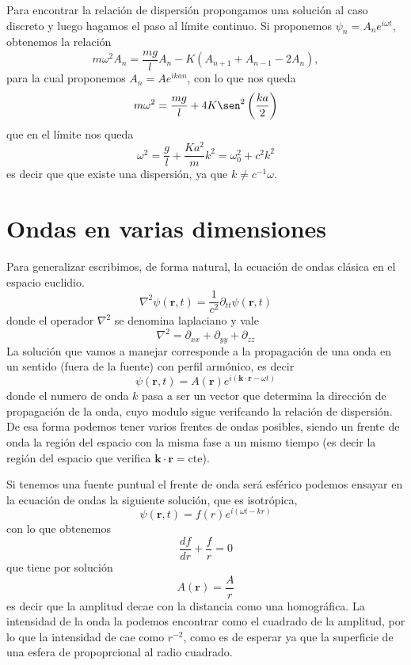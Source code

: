 \documentclass[a4paper]{article}
\numberwithin{equation}{section}
\begin{document}
	Para encontrar la relación de dispersión propongamos una solución al caso discreto y luego hagamos el paso al límite continuo. Si proponemos $\psi_n = A_n e^{i \omega t}$, obtenemos la relación \[m \omega^2 A_n = \frac{m g}{l} A_n - K (A_{n+1} + A_{n-1} - 2 A_n),\] para la cual proponemos $A_n = A e^{i k a n}$, con lo que nos queda \[m \omega^2 = \frac{m g}{l} + 4 K \sen^2\left(\frac{k a}{2}\right)\] que en el límite nos queda
	\begin{equation}
		\omega^2 = \frac{g}{l} + \frac{K a^2}{m} k^2 = \omega_0^2 + c^2 k^2
		\label{eq:ondas_klein_gordon_dispersion}
	\end{equation}
	es decir que que existe una dispersión, ya que $k \neq c^{-1} \omega$.
\section{Ondas en varias dimensiones}
	Para generalizar escribimos, de forma natural, la ecuación de ondas clásica en el espacio euclidio.
	\begin{equation}
		\nabla^2 \psi(\textbf{r},t) = \frac{1}{c^2} \partial_{tt} \psi(\textbf{r},t)
		\label{eq:ondas_ecuacion_general}
	\end{equation}
	donde el operador $\nabla^2$ se denomina laplaciano y vale
	\begin{equation}
		\nabla^2 = \partial_{xx} + \partial_{yy} + \partial_{zz}
		\label{eq:laplaciano_cartesianas}
	\end{equation}
	La solución que vamos a manejar corresponde a la propagación de una onda en un sentido (fuera de la fuente) con perfil armónico, es decir
	\begin{equation}
		\psi(\textbf{r},t) = A(\textbf{r}) e^{i (\textbf{k} \cdot \textbf{r} - \omega t)}
		\label{eq:ondas_ecuacion_general_solucion}
	\end{equation}
	donde el numero de onda $k$ pasa a ser un vector que determina la dirección de propagación de la onda, cuyo modulo sigue verifcando la relación de dispersión. De esa forma podemos tener varios frentes de ondas posibles, siendo un frente de onda la región del espacio con la misma fase a un mismo tiempo (es decir la región del espacio que verifica $\textbf{k} \cdot \textbf{r} = \text{cte}$). 
	
	Si tenemos una fuente puntual el frente de onda será esférico podemos ensayar en la ecuación de ondas la siguiente solución, que es isotrópica, \[\psi(\textbf{r},t) = f(r) e^{i (\omega t - k r)}\] con lo que obtenemos \[\frac{df}{dr} + \frac{f}{r} = 0\] que tiene por solución
	\begin{equation}
		A(\textbf{r}) = \frac{A}{r}
		\label{eq:ondas_ecuacion_general_amplitud_esferica}
	\end{equation}
	es decir que la amplitud decae con la distancia como una homográfica. La intensidad de la onda la podemos encontrar como el cuadrado de la amplitud, por lo que la intensidad de cae como $r^{-2}$, como es de esperar ya que la superficie de una esfera de propoprcional al radio cuadrado.
	
\end{document}
